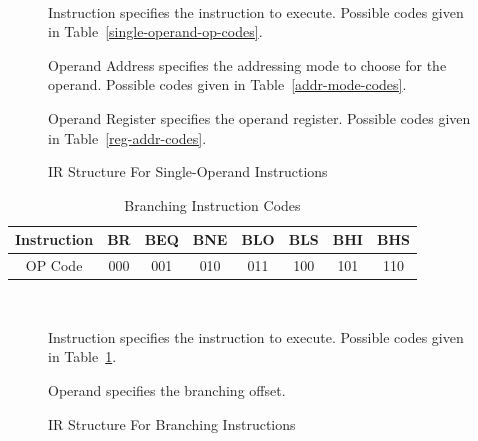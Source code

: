 \documentclass[12pt]{article}
\theoremstyle{plain}
\theoremstyle{definition}
\begin{document}
    \begin{figure}[H]
        \centering
        \caption{IR Structure For Single-Operand Instructions}
        \label{IR-SingleOp}
        \vspace{0.5 cm}
         \\
        \vspace{0.5 cm}
        \begin{regdesc}\begin{reglist}            
            \item [Instruction] specifies the instruction to execute. Possible codes given in Table~\ref{single-operand-op-codes}.
            \item [Operand Address] specifies the addressing mode to choose for the operand. Possible codes given in Table~\ref{addr-mode-codes}.
            \item [Operand Register] specifies the operand register. Possible codes given in Table~\ref{reg-addr-codes}.
        \end{reglist}\end{regdesc}
    \end{figure}
    \begin{table}[H]
        \centering
        \begin{tabular}{|c|c|c|c|c|c|c|c|}
            \hline
            Instruction & BR  & BEQ  & BNE  & BLO  & BLS  & BHI  & BHS \\ \hline
            OP Code     & 000 & 001 & 010 & 011 & 100 & 101 & 110 \\ \hline
        \end{tabular}
        \caption{Branching Instruction Codes}
        \label{br-op-codes}
    \end{table}
    \begin{figure}[H]
        \centering
        \caption{IR Structure For Branching Instructions}
        \label{IR-Branch}
        \vspace{0.5 cm}
         \\
        \vspace{0.5 cm}
        \begin{regdesc}\begin{reglist}            
            \item [Instruction] specifies the instruction to execute. Possible codes given in Table~\ref{br-op-codes}.
            \item [Operand] specifies the branching offset.
        \end{reglist}\end{regdesc}
    \end{figure}
\end{document}
